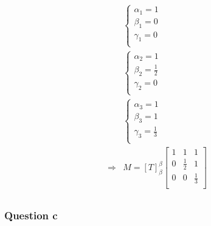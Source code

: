 \documentclass{article}
\begin{document}
\begin{equation*}
\begin{split}
&\begin{cases}
\alpha_1=1\\
\beta_1=0\\
\gamma_1=0\\
\end{cases}\\
&\begin{cases}
\alpha_2=1\\
\beta_2=\frac{1}{2}\\
\gamma_2=0\\
\end{cases}\\
&\begin{cases}
\alpha_3=1\\
\beta_3=1\\
\gamma_3=\frac{1}{3}\\
\end{cases}\\
\Rightarrow &M=\left[T\right]^\beta_\beta\begin{bmatrix}
1&1&1\\
0&\frac{1}{2}&1\\
0&0&\frac{1}{3}\\
\end{bmatrix}\\
\end{split}
\end{equation*}

\subsubsection{Question c}

~
\end{document}
